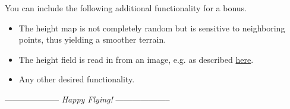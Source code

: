 \documentclass[addpoints]{exam}
\begin{document}
\begin{questions}
  You can include the following additional functionality for a bonus.
  \begin{itemize}
  \item The height map is not completely random but is sensitive to neighboring points, thus yielding a smoother terrain.
  \item The height field is read in from an image, e.g. as described \href{http://www.cs.cmu.edu/~jkh/462_s07/assts/assignment1/}{here}.
  \item Any other desired functionality.
  \end{itemize}
\end{questions}
\bigskip
  \centerline{-------------------- \textit{Happy Flying!} --------------------}
\end{document}
